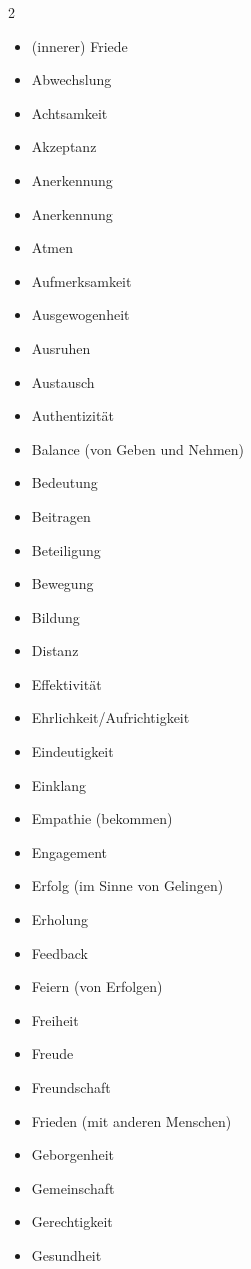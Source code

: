 \begin{multicols}{2}
    \begin{itemize}
        \item (innerer) Friede
        \item Abwechslung
        \item Achtsamkeit
        \item Akzeptanz
        \item Anerkennung
        \item Anerkennung
        \item Atmen
        \item Aufmerksamkeit
        \item Ausgewogenheit
        \item Ausruhen
        \item Austausch
        \item Authentizität
        \item Balance (von Geben und Nehmen)
        \item Bedeutung
        \item Beitragen
        \item Beteiligung
        \item Bewegung
        \item Bildung
        \item Distanz
        \item Effektivität
        \item Ehrlichkeit/Aufrichtigkeit
        \item Eindeutigkeit
        \item Einklang
        \item Empathie (bekommen)
        \item Engagement
        \item Erfolg (im Sinne von \glqq Gelingen\grqq)
        \item Erholung
        \item Feedback
        \item Feiern (von Erfolgen)
        \item Freiheit
        \item Freude
        \item Freundschaft
        \item Frieden (mit anderen Menschen)
        \item Geborgenheit
        \item Gemeinschaft
        \item Gerechtigkeit
        \item Gesundheit

\end{itemize}
\end{multicols}
